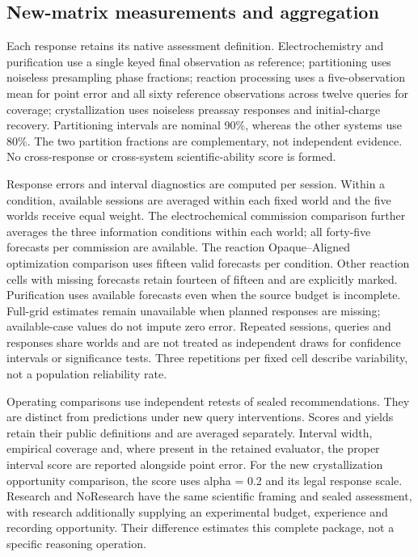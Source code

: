 \documentclass[12pt,a4paper]{article}
\begin{document}
\subsection{New-matrix measurements and aggregation}\label{new-matrix-measurements-and-aggregation}

Each response retains its native assessment definition. Electrochemistry and purification use a single keyed final observation as reference; partitioning uses noiseless presampling phase fractions; reaction processing uses a five-observation mean for point error and all sixty reference observations across twelve queries for coverage; crystallization uses noiseless preassay responses and initial-charge recovery. Partitioning intervals are nominal 90\%, whereas the other systems use 80\%. The two partition fractions are complementary, not independent evidence. No cross-response or cross-system scientific-ability score is formed.

Response errors and interval diagnostics are computed per session. Within a condition, available sessions are averaged within each fixed world and the five worlds receive equal weight. The electrochemical commission comparison further averages the three information conditions within each world; all forty-five forecasts per commission are available. The reaction Opaque--Aligned optimization comparison uses fifteen valid forecasts per condition. Other reaction cells with missing forecasts retain fourteen of fifteen and are explicitly marked. Purification uses available forecasts even when the source budget is incomplete. Full-grid estimates remain unavailable when planned responses are missing; available-case values do not impute zero error. Repeated sessions, queries and responses share worlds and are not treated as independent draws for confidence intervals or significance tests. Three repetitions per fixed cell describe variability, not a population reliability rate.

Operating comparisons use independent retests of sealed recommendations. They are distinct from predictions under new query interventions. Scores and yields retain their public definitions and are averaged separately. Interval width, empirical coverage and, where present in the retained evaluator, the proper interval score are reported alongside point error. For the new crystallization opportunity comparison, the score uses alpha = 0.2 and its legal response scale. Research and NoResearch have the same scientific framing and sealed assessment, with research additionally supplying an experimental budget, experience and recording opportunity. Their difference estimates this complete package, not a specific reasoning operation.
\end{document}
